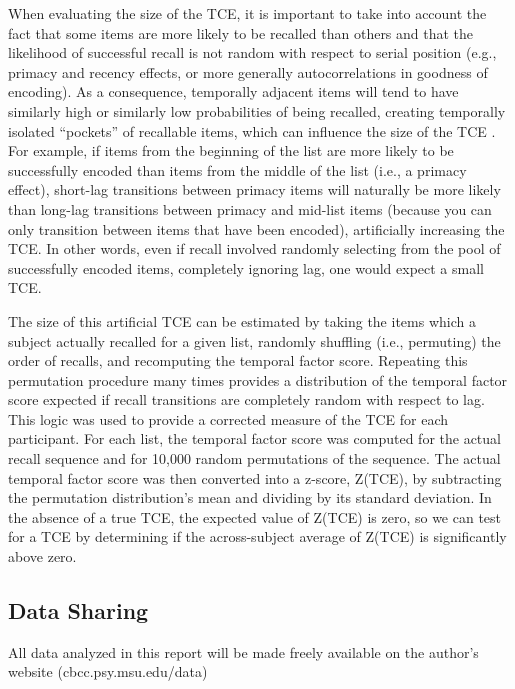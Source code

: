 \documentclass[jou,natbib]{apa6} %
\begin{document}
When evaluating the size of the TCE, it is important to take into account the fact that some items are more likely to be recalled than others and that the likelihood of successful recall is not random with respect to serial position (e.g., primacy and recency effects, or more generally autocorrelations in goodness of encoding). As a consequence, temporally adjacent items will tend to have similarly high or similarly low probabilities of being recalled, creating temporally isolated ``pockets'' of recallable items, which can influence the size of the TCE \citep{Hint16,HealEtal16,SedeEtal10}. For example, if items from the beginning of the list are more likely to be successfully encoded than items from the middle of the list (i.e., a primacy effect), short-lag transitions between primacy items will naturally be more likely than long-lag transitions between primacy and mid-list items (because you can only transition between items that have been encoded), artificially increasing the TCE. In other words, even if recall involved randomly selecting from the pool of successfully encoded items, completely ignoring lag, one would expect a small TCE.

The size of this artificial TCE can be estimated by taking the items which a subject actually recalled for a given list, randomly shuffling (i.e., permuting) the order of recalls, and recomputing the temporal factor score. Repeating this permutation procedure many times provides a distribution of the temporal factor score expected if recall transitions are completely random with respect to lag. This logic was used to provide a corrected measure of the TCE for each participant. For each list, the temporal factor score was computed for the actual recall sequence and for 10,000 random permutations of the sequence.
The actual temporal factor score was then converted into a z-score, Z(TCE), by subtracting the permutation distribution's mean and dividing by its standard deviation. In the absence of a true TCE, the expected value of Z(TCE) is zero, so we can test for a TCE by determining if the across-subject average of Z(TCE) is significantly above zero.

\subsection{Data Sharing}All data analyzed in this report will be made freely available on the author's website (cbcc.psy.msu.edu/data)
\end{document}
